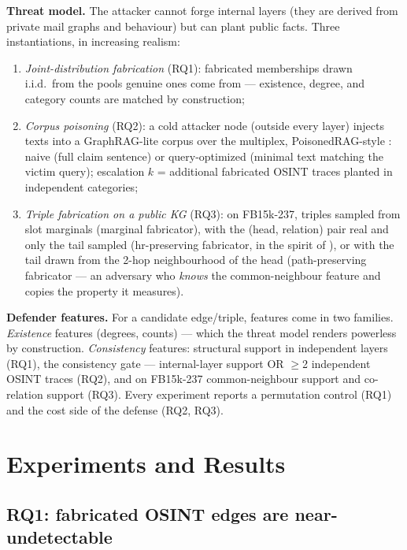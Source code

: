 \documentclass[conference]{IEEEtran}
\begin{document}
\textbf{Threat model.} The attacker cannot forge internal layers (they are
derived from private mail graphs and behaviour) but can plant public facts.
Three instantiations, in increasing realism:
\begin{enumerate}
\item \emph{Joint-distribution fabrication} (RQ1): fabricated memberships
drawn i.i.d.\ from the pools genuine ones come from --- existence, degree,
and category counts are matched by construction;
\item \emph{Corpus poisoning} (RQ2): a cold attacker node (outside every
layer) injects texts into a GraphRAG-lite corpus over the multiplex,
PoisonedRAG-style \cite{zou2024poisonedrag}: naive (full claim sentence) or
query-optimized (minimal text matching the victim query); escalation $k$ =
additional fabricated OSINT traces planted in independent categories;
\item \emph{Triple fabrication on a public KG} (RQ3): on FB15k-237, triples
sampled from slot marginals (marginal fabricator), with the (head,
relation) pair real and only the tail sampled (hr-preserving fabricator,
in the spirit of \cite{you2023mass}), or with the tail drawn from the
2-hop neighbourhood of the head (path-preserving fabricator --- an
adversary who \emph{knows} the common-neighbour feature and copies the
property it measures).
\end{enumerate}

\textbf{Defender features.} For a candidate edge/triple, features come in
two families. \emph{Existence} features (degrees, counts) --- which the
threat model renders powerless by construction. \emph{Consistency}
features: structural support in independent layers (RQ1), the consistency
gate --- internal-layer support OR $\ge$2 independent OSINT traces (RQ2),
and on FB15k-237 common-neighbour support and co-relation support (RQ3).
Every experiment reports a permutation control (RQ1) and the cost side of
the defense (RQ2, RQ3).

\section{Experiments and Results}
\label{sec:results}

\subsection{RQ1: fabricated OSINT edges are near-undetectable}
\label{sec:res-fab}
\end{document}
